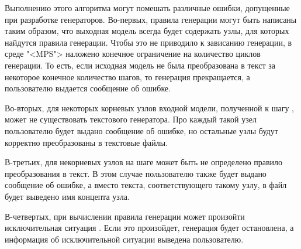 Выполнению этого алгоритма могут помешать различные ошибки, допущенные при разработке генераторов. Во-первых, правила генерации могут быть написаны таким образом, что выходная модель всегда будет содержать узлы, для которых найдутся правила генерации. Чтобы это не приводило к зависанию генерации, в среде "<MPS"> наложено конечное ограничение на количество циклов генерации. То есть, если исходная модель не была преобразована в текст за некоторое конечное количество шагов, то генерация прекращается,  а пользователю выдается сообщение об ошибке.

Во-вторых, для некоторых корневых узлов входной модели, полученной к шагу , может не существовать текстового генератора. Про каждый такой узел пользователю будет выдано сообщение об ошибке, но остальные узлы будут корректно преобразованы в текстовые файлы.

В-третьих, для некорневых узлов на шаге  может быть не определено правило преобразования в текст. В этом случае пользователю также будет выдано сообщение об ошибке, а вместо текста, соответствующего такому узлу, в файл будет выведено имя концепта узла.

В-четвертых, при вычислении правила генерации может произойти исключительная ситуация \cite{eckel}. Если это произойдет, генерация будет остановлена, а информация об исключительной ситуации выведена пользователю.

